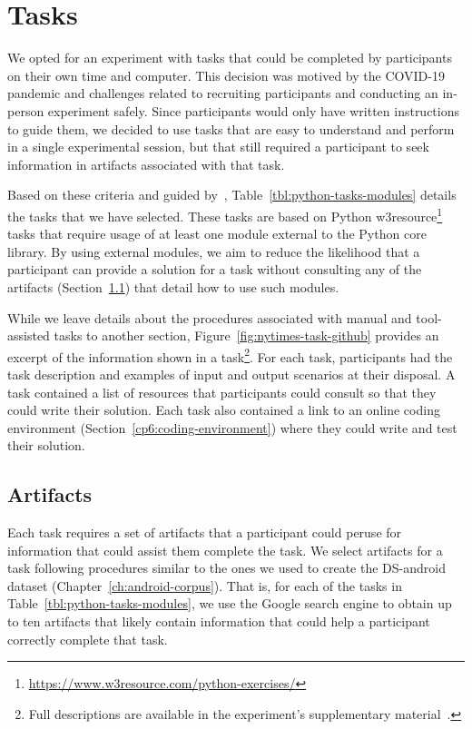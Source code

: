 
\section{Tasks}
\label{cp6:tasks}


We opted for an experiment with tasks that could be completed by participants on their own time and computer.
This decision was motived by the COVID-19 pandemic and challenges related to recruiting participants and conducting an in-person experiment safely\red{~\cite{}}. 
Since participants would only have written instructions to guide them, we decided to use tasks that are easy to understand and perform in a single experimental session, but that still required a participant  
to seek information in artifacts associated with that task.



Based on these criteria and guided by~\cite{thiselton2019},
Table~\ref{tbl:python-tasks-modules} details the tasks that we have selected. 
These tasks are based on 
Python w3resource\footnote{\url{https://www.w3resource.com/python-exercises/}} tasks
that require usage of at least one module external to the Python core library.
By using external modules, we aim to reduce the likelihood that a participant 
can provide a solution for a task without consulting any of the artifacts (Section~\ref{cp6:experiment-artifacts})
that detail how to use such modules. 



While we leave details about the procedures associated with manual and tool-assisted tasks to another section, Figure~\ref{fig:nytimes-task-github} provides an excerpt of the information shown in a task\footnote{Full descriptions are available in the experiment's supplementary material~\red{\cite{}}.}.
For each task, participants had the task description and examples of input and output scenarios at their disposal. A task contained a list of resources that participants could consult 
so that they could write their solution.
Each task also contained a link to an online coding environment (Section~\ref{cp6:coding-environment})
where they could write and test their solution. 





\subsection{Artifacts}
\label{cp6:experiment-artifacts}


Each task requires a set of artifacts that a participant could peruse for information that could assist them complete the task.
We select artifacts for a task following procedures similar to the ones we used to create the \acs{DS-android} dataset (Chapter~\ref{ch:android-corpus}). 
That is, for each of the tasks in Table~\ref{tbl:python-tasks-modules}, we use the Google search engine to obtain up to ten artifacts that likely contain 
information that could help a participant correctly complete that task. 



